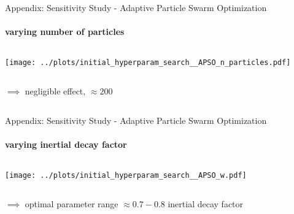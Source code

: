\documentclass[11pt,aspectratio=169]{beamer}
\begin{document}
%
%

\begin{closingframe}{Appendix: Sensitivity Study - Adaptive Particle Swarm Optimization}
    \framesubtitle{varying \textbf{number of particles}}

    \begin{columns}
    \begin{column}{0.8\textwidth}
        \texttt{[image: ../plots/initial\_hyperparam\_search\_\_APSO\_n\_particles.pdf]}
    \end{column}
    \end{columns}

    \begin{columns}
        \begin{column}{0.8\textwidth}
            $\implies$ negligible effect, $\approx 200$
        \end{column}
        \begin{column}{0.1\textwidth}
            \tiny{}
        \end{column}
    \end{columns}
\end{closingframe}

%
%

\begin{closingframe}{Appendix: Sensitivity Study - Adaptive Particle Swarm Optimization}
    \framesubtitle{varying \textbf{inertial decay factor}}

    \begin{columns}
    \begin{column}{0.8\textwidth}
        \texttt{[image: ../plots/initial\_hyperparam\_search\_\_APSO\_w.pdf]}
    \end{column}
    \end{columns}

    \begin{columns}
        \begin{column}{0.8\textwidth}
            $\implies$ optimal parameter range $\approx 0.7 - 0.8$ inertial decay factor
        \end{column}
        \begin{column}{0.1\textwidth}
            \tiny{}
        \end{column}
    \end{columns}
\end{closingframe}
\end{document}
